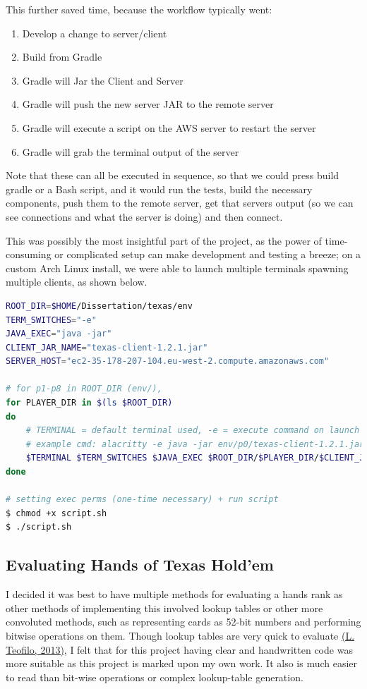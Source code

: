 \documentclass[11pt]{article}
\begin{document}
This further saved time, because the workflow typically went:

\begin{enumerate}
	\item Develop a change to server/client
	\item Build from Gradle
	\item Gradle will Jar the Client and Server
	\item Gradle will push the new server JAR to the remote server
	\item Gradle will execute a script on the AWS server to restart the server
	\item Gradle will grab the terminal output of the server
\end{enumerate}

Note that these can all be executed in sequence, so that we could press build gradle or a Bash script, and it would run the tests, build the necessary components, push them to the remote server, get that servers output (so we can see connections and what the server is doing) and then connect. 

This was possibly the most insightful part of the project, as the power of time-consuming or complicated setup can make development and testing a breeze; on a custom Arch Linux install, we were able to launch multiple terminals spawning multiple clients, as shown below. \\


\begin{lstlisting}[language=bash]
ROOT_DIR=$HOME/Dissertation/texas/env
TERM_SWITCHES="-e"
JAVA_EXEC="java -jar"
CLIENT_JAR_NAME="texas-client-1.2.1.jar"
SERVER_HOST="ec2-35-178-207-104.eu-west-2.compute.amazonaws.com"

# for p1-p8 in ROOT_DIR (env/), 
for PLAYER_DIR in $(ls $ROOT_DIR)
do
	# TERMINAL = default terminal used, -e = execute command on launch
	# example cmd: alacritty -e java -jar env/p0/texas-client-1.2.1.jar 192.168.0.1
	$TERMINAL $TERM_SWITCHES $JAVA_EXEC $ROOT_DIR/$PLAYER_DIR/$CLIENT_JAR_NAME $SERVER_HOST
done

# setting exec perms (one-time necessary) + run script
$ chmod +x script.sh
$ ./script.sh
\end{lstlisting}

\newpage
\subsection{Evaluating Hands of Texas Hold'em}

I decided it was best to have multiple methods for evaluating a hands rank as other methods of implementing this involved lookup tables or other more convoluted methods, such as representing cards as 52-bit numbers and performing bitwise operations on them. Though lookup tables are very quick to evaluate \hyperlink{lookup}{(L. Teofilo, 2013)}, I felt that for this project having clear and handwritten code was more suitable as this project is marked upon my own work. It also is much easier to read than bit-wise operations or complex lookup-table generation. \\
\end{document}
